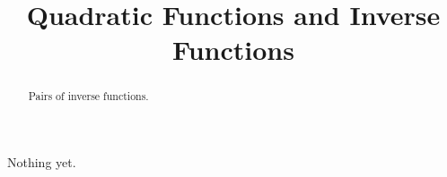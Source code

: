 \documentclass{ximera}
\title{Quadratic Functions and Inverse Functions}
\begin{document}
\begin{abstract}
Pairs of inverse functions.
\end{abstract}
\maketitle

Nothing yet.
\end{document}
